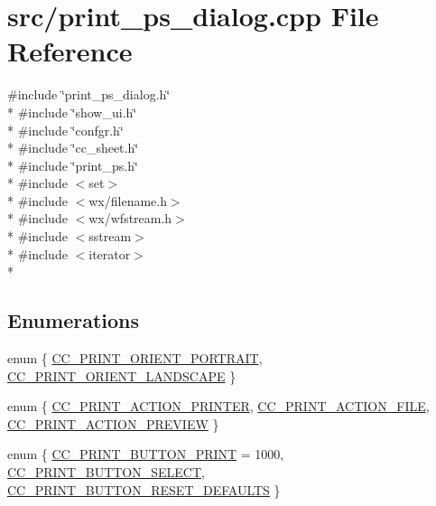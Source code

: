 \hypertarget{a00240}{\section{src/print\-\_\-ps\-\_\-dialog.cpp File Reference}
\label{a00240}
}
{\ttfamily \#include \char`\"{}print\-\_\-ps\-\_\-dialog.\-h\char`\"{}}\\*
{\ttfamily \#include \char`\"{}show\-\_\-ui.\-h\char`\"{}}\\*
{\ttfamily \#include \char`\"{}confgr.\-h\char`\"{}}\\*
{\ttfamily \#include \char`\"{}cc\-\_\-sheet.\-h\char`\"{}}\\*
{\ttfamily \#include \char`\"{}print\-\_\-ps.\-h\char`\"{}}\\*
{\ttfamily \#include $<$set$>$}\\*
{\ttfamily \#include $<$wx/filename.\-h$>$}\\*
{\ttfamily \#include $<$wx/wfstream.\-h$>$}\\*
{\ttfamily \#include $<$sstream$>$}\\*
{\ttfamily \#include $<$iterator$>$}\\*
\subsection*{Enumerations}
\begin{DoxyCompactItemize}
\item 
enum \{ \hyperlink{a00240_a726ca809ffd3d67ab4b8476646f26635a23acfba705dfc10bf7db7e2a894847e1}{C\-C\-\_\-\-P\-R\-I\-N\-T\-\_\-\-O\-R\-I\-E\-N\-T\-\_\-\-P\-O\-R\-T\-R\-A\-I\-T}, 
\hyperlink{a00240_a726ca809ffd3d67ab4b8476646f26635a62e1ffbd31308955a46ad85794cbcb55}{C\-C\-\_\-\-P\-R\-I\-N\-T\-\_\-\-O\-R\-I\-E\-N\-T\-\_\-\-L\-A\-N\-D\-S\-C\-A\-P\-E}
 \}
\item 
enum \{ \hyperlink{a00240_a0411cd49bb5b71852cecd93bcbf0ca2da5ed35ebd2beb4900df8633e62821a2b6}{C\-C\-\_\-\-P\-R\-I\-N\-T\-\_\-\-A\-C\-T\-I\-O\-N\-\_\-\-P\-R\-I\-N\-T\-E\-R}, 
\hyperlink{a00240_a0411cd49bb5b71852cecd93bcbf0ca2da5e1f56a13d9e6e3c378e9ec032726f87}{C\-C\-\_\-\-P\-R\-I\-N\-T\-\_\-\-A\-C\-T\-I\-O\-N\-\_\-\-F\-I\-L\-E}, 
\hyperlink{a00240_a0411cd49bb5b71852cecd93bcbf0ca2da1b1d30aa04407b4ea8c86da623cfcddd}{C\-C\-\_\-\-P\-R\-I\-N\-T\-\_\-\-A\-C\-T\-I\-O\-N\-\_\-\-P\-R\-E\-V\-I\-E\-W}
 \}
\item 
enum \{ \hyperlink{a00240_abed82baf7f470b522273a3e37c24c600a248126ed0e8826ac0949433091a4c695}{C\-C\-\_\-\-P\-R\-I\-N\-T\-\_\-\-B\-U\-T\-T\-O\-N\-\_\-\-P\-R\-I\-N\-T} = 1000, 
\hyperlink{a00240_abed82baf7f470b522273a3e37c24c600a8f5d944604f7aba6396cd8cdec91a7e9}{C\-C\-\_\-\-P\-R\-I\-N\-T\-\_\-\-B\-U\-T\-T\-O\-N\-\_\-\-S\-E\-L\-E\-C\-T}, 
\hyperlink{a00240_abed82baf7f470b522273a3e37c24c600abd2fd7f0c533356c6409e1e8b5b98a5f}{C\-C\-\_\-\-P\-R\-I\-N\-T\-\_\-\-B\-U\-T\-T\-O\-N\-\_\-\-R\-E\-S\-E\-T\-\_\-\-D\-E\-F\-A\-U\-L\-T\-S}
 \}
\end{DoxyCompactItemize}


